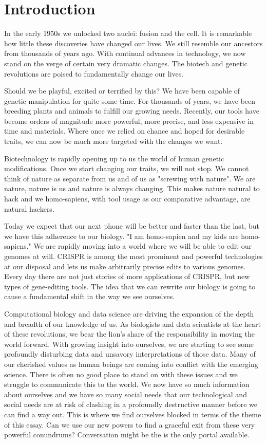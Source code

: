 \section{Introduction}
\label{sec:introduction}

In the early 1950s we unlocked two nuclei: fusion and the cell.
It is remarkable how little these discoveries have changed our lives.
We still resemble our ancestors from thousands of years ago.
With continual advances in technology, we now stand on the verge of certain very dramatic changes.
The biotech and genetic revolutions are poised to fundamentally change our lives.

Should we be playful, excited or terrified by this?
We have been capable of genetic manipulation for quite some time.
For thousands of years, we have been breeding plants and animals to fulfill our growing needs.
Recently, our tools have become orders of magnitude more powerful, more precise, and less expensive in time and materials.
Where once we relied on chance and hoped for desirable traits, we can now be much more targeted with the changes we want.

Biotechnology is rapidly opening up to us the world of human genetic modifications.
Once we start changing our traits, we will not stop.
We cannot think of nature as separate from us and of us as "screwing with nature".
We are nature, nature is us and nature is always changing.
This makes nature natural to hack and we homo-sapiens, with tool usage as our comparative advantage, are natural hackers.

Today we expect that our next phone will be better and faster than the last, but we have this adherence to our biology.
"I am homo-sapien and my kids are homo-sapiens."
We are rapidly moving into a world where we will be able to edit our genomes at will.
CRISPR is among the most prominent and powerful technologies at our disposal and lets us make arbitrarily precise edits to various genomes.
Every day there are not just stories of more applications of CRISPR, but new types of gene-editing tools.
The idea that we can rewrite our biology is going to cause a fundamental shift in the way we see ourselves.

Computational biology and data science are driving the expansion of the depth and breadth of our knowledge of us.
As biologists and data scientists at the heart of these revolutions, we bear the lion's share of the responsibility in moving the world forward.
With growing insight into ourselves, we are starting to see some profoundly disturbing data and unsavory interpretations of those data.
Many of our cherished values as human beings are coming into conflict with the emerging science.
There is often no good place to stand on with these issues and we struggle to communicate this to the world.
We now have so much information about ourselves and we have so many social needs that our technological and social needs are at risk of clashing in a profoundly destructive manner before we can find a way out.
This is where we find ourselves blocked in terms of the theme of this essay.
Can we use our new powers to find a graceful exit from these very powerful conundrums?
Conversation might be the is the only portal available.


